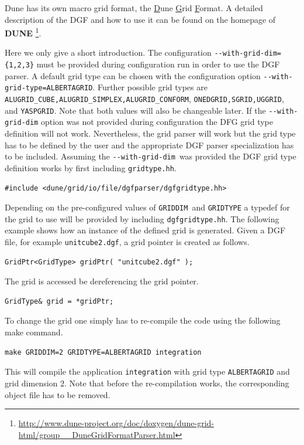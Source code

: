 \documentclass[11pt,a4paper,headinclude,footinclude,DIV16,normalheadings]{scrreprt}
\newcommand{\Dune}{{\sf\bfseries DUNE}\xspace}
\begin{document}
Dune has its own macro grid format, the \underline{D}une \underline{G}rid \underline{F}ormat. 
A detailed description of the DGF and how to use it can be found on the
homepage of \Dune%
\footnote{\url{http://www.dune-project.org/doc/doxygen/dune-grid-html/group__DuneGridFormatParser.html}}.

Here we only give a short introduction. The configuration
\lstinline!--with-grid-dim={1,2,3}! must be provided during configuration run
in order to use the DGF parser. A default grid type can be chosen with the
configuration option  \lstinline!--with-grid-type=ALBERTAGRID!.
Further possible grid types are \lstinline!ALUGRID_CUBE,ALUGRID_SIMPLEX,ALUGRID_CONFORM!, 
\lstinline!ONEDGRID,SGRID,UGGRID!, and \lstinline!YASPGRID!.
Note that both values will also be changeable later. 
If the \lstinline!--with-grid-dim! option was not provided during configuration the 
DFG grid type definition will not work. Nevertheless, the grid parser will work 
but the grid type has to be defined by the user and the appropriate DGF parser 
specialization has to be included. 
Assuming the \lstinline!--with-grid-dim!\ was provided the DGF grid type 
definition works by first including \lstinline!gridtype.hh!.
\begin{lstlisting}[basicstyle=\ttfamily\scriptsize]
#include <dune/grid/io/file/dgfparser/dgfgridtype.hh>
\end{lstlisting}
Depending on the pre-configured values of \lstinline!GRIDDIM!\ and
\lstinline!GRIDTYPE! a typedef for the grid to use will be provided by
including \lstinline!dgfgridtype.hh!. The following example shows how an 
instance of the defined grid is generated. Given a DGF file, for example 
\lstinline!unitcube2.dgf!, a grid pointer is created as follows.
\begin{lstlisting}[basicstyle=\ttfamily\scriptsize]
GridPtr<GridType> gridPtr( "unitcube2.dgf" );
\end{lstlisting}
The grid is accessed be dereferencing the grid pointer.
\begin{lstlisting}[basicstyle=\ttfamily\scriptsize]
GridType& grid = *gridPtr; 
\end{lstlisting}
To change the grid one simply has to re-compile the code using the following make command.
\begin{lstlisting}[basicstyle=\ttfamily\scriptsize]
make GRIDDIM=2 GRIDTYPE=ALBERTAGRID integration 
\end{lstlisting}
This will compile the application \texttt{integration} with grid type \lstinline!ALBERTAGRID! and grid dimension $2$.
Note that before the re-compilation works, 
the corresponding object file has to be removed.
\end{document}
